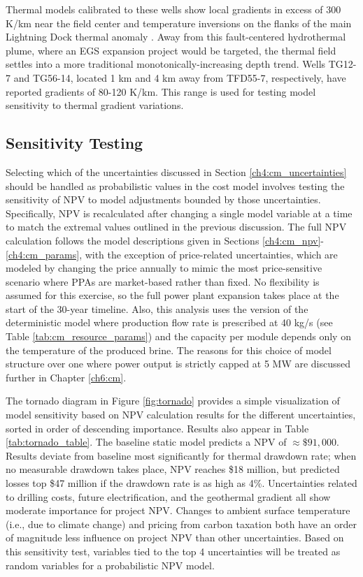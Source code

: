 Thermal models calibrated to these wells show local gradients in excess of 300 K/km near the field center and temperature inversions on the flanks of the main Lightning Dock thermal anomaly \citep[see Figs.\ 23-24]{cunniff_final_2005}. Away from this fault-centered hydrothermal plume, where an EGS expansion project would be targeted, the thermal field settles into a more traditional monotonically-increasing depth trend. Wells TG12-7 and TG56-14, located 1 km and 4 km away from TFD55-7, respectively, have reported gradients of 80-120 K/km. This range is used for testing model sensitivity to thermal gradient variations.

\subsection{Sensitivity Testing}

Selecting which of the uncertainties discussed in Section \ref{ch4:cm_uncertainties} should be handled as probabilistic values in the cost model involves testing the sensitivity of NPV to model adjustments bounded by those uncertainties. Specifically, NPV is recalculated after changing a single model variable at a time to match the extremal values outlined in the previous discussion. The full NPV calculation follows the model descriptions given in Sections \ref{ch4:cm_npv}-\ref{ch4:cm_params}, with the exception of price-related uncertainties, which are modeled by changing the price annually to mimic the most price-sensitive scenario where PPAs are market-based rather than fixed. No flexibility is assumed for this exercise, so the full power plant expansion takes place at the start of the 30-year timeline. Also, this analysis uses the version of the deterministic model where production flow rate is prescribed at 40 kg/s (see Table \ref{tab:cm_resource_params}) and the capacity per module depends only on the temperature of the produced brine. The reasons for this choice of model structure over one where power output is strictly capped at 5 MW are discussed further in Chapter \ref{ch6:cm}.

The tornado diagram in Figure \ref{fig:tornado} provides a simple visualization of model sensitivity based on NPV calculation results for the different uncertainties, sorted in order of descending importance. Results also appear in Table \ref{tab:tornado_table}. The baseline static model predicts a NPV of $\approx \$91,000$. Results deviate from baseline most significantly for thermal drawdown rate; when no measurable drawdown takes place, NPV reaches \$18 million, but predicted losses top \$47 million if the drawdown rate is as high as 4\%. Uncertainties related to drilling costs, future electrification, and the geothermal gradient all show moderate importance for project NPV. Changes to ambient surface temperature (i.e., due to climate change) and pricing from carbon taxation both have an order of magnitude less influence on project NPV than other uncertainties. Based on this sensitivity test, variables tied to the top 4 uncertainties will be treated as random variables for a probabilistic NPV model.


